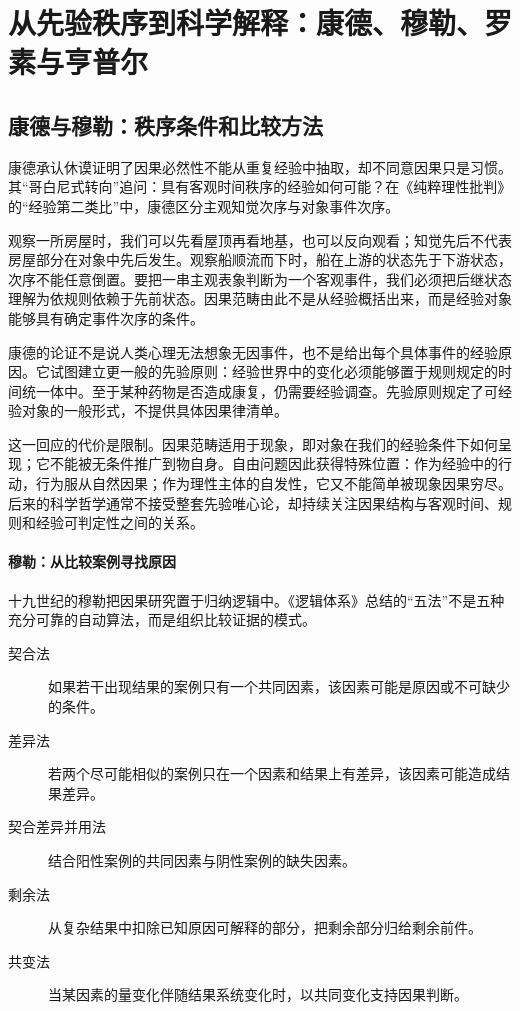 \section{从先验秩序到科学解释：康德、穆勒、罗素与亨普尔}

\subsection{康德与穆勒：秩序条件和比较方法}

康德承认休谟证明了因果必然性不能从重复经验中抽取，却不同意因果只是习惯。其“哥白尼式转向”追问：具有客观时间秩序的经验如何可能？在《纯粹理性批判》的“经验第二类比”中，康德区分主观知觉次序与对象事件次序\parencite{kantCPR}。

观察一所房屋时，我们可以先看屋顶再看地基，也可以反向观看；知觉先后不代表房屋部分在对象中先后发生。观察船顺流而下时，船在上游的状态先于下游状态，次序不能任意倒置。要把一串主观表象判断为一个客观事件，我们必须把后继状态理解为依规则依赖于先前状态。因果范畴由此不是从经验概括出来，而是经验对象能够具有确定事件次序的条件。

康德的论证不是说人类心理无法想象无因事件，也不是给出每个具体事件的经验原因。它试图建立更一般的先验原则：经验世界中的变化必须能够置于规则规定的时间统一体中。至于某种药物是否造成康复，仍需要经验调查。先验原则规定了可经验对象的一般形式，不提供具体因果律清单。

这一回应的代价是限制。因果范畴适用于现象，即对象在我们的经验条件下如何呈现；它不能被无条件推广到物自身。自由问题因此获得特殊位置：作为经验中的行动，行为服从自然因果；作为理性主体的自发性，它又不能简单被现象因果穷尽。后来的科学哲学通常不接受整套先验唯心论，却持续关注因果结构与客观时间、规则和经验可判定性之间的关系。

\paragraph{穆勒：从比较案例寻找原因}

十九世纪的穆勒把因果研究置于归纳逻辑中。《逻辑体系》总结的“五法”不是五种充分可靠的自动算法，而是组织比较证据的模式\parencite{millSystemLogic}。

\begin{description}
  \item[契合法] 如果若干出现结果的案例只有一个共同因素，该因素可能是原因或不可缺少的条件。
  \item[差异法] 若两个尽可能相似的案例只在一个因素和结果上有差异，该因素可能造成结果差异。
  \item[契合差异并用法] 结合阳性案例的共同因素与阴性案例的缺失因素。
  \item[剩余法] 从复杂结果中扣除已知原因可解释的部分，把剩余部分归给剩余前件。
  \item[共变法] 当某因素的量变化伴随结果系统变化时，以共同变化支持因果判断。
\end{description}

